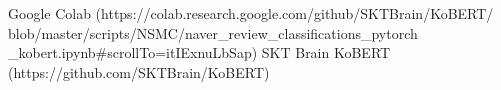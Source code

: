 \documentclass[conference]{IEEEtran}
\begin{document}
\clearpage
\begin{thebibliography}{00}

 Google Colab (https://colab.research.google.com/github/SKTBrain/KoBERT/\\blob/master/scripts/NSMC/naver\_review\_classifications\_pytorch\\\_kobert.ipynb#scrollTo=itIExnuLbSap)
 SKT Brain KoBERT (https://github.com/SKTBrain/KoBERT)
\end{thebibliography}

    
\end{document}
